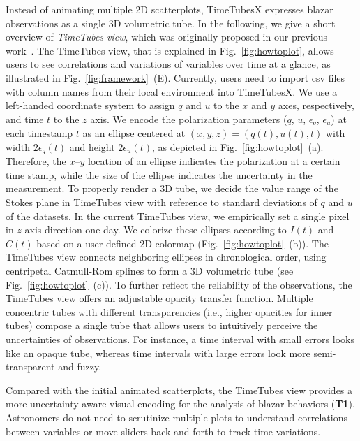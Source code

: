 Instead of animating multiple 2D scatterplots,
TimeTubesX expresses blazar observations as a single 3D volumetric tube. 
In the following, we give a short overview of \emph{TimeTubes view}, which was originally proposed in our previous work~\cite{Fujishiro2018}.
The TimeTubes view, that is explained in Fig.~\ref{fig:howtoplot}, allows users to see correlations and variations of variables over time at a glance, as illustrated in Fig.~\ref{fig:framework}~(E).
Currently, users need to import csv files with column names from their local environment into TimeTubesX.
%
We use a left-handed coordinate system to assign $q$ and $u$ to the $x$ and $y$ axes, respectively, and time $t$ to the $z$ axis.
We encode the polarization parameters ($q$, $u$, $\epsilon_q$, $\epsilon_u$) at each timestamp $t$ as an ellipse centered at $(x, y, z) = (q(t), u(t), t)$ with width $2\epsilon_q(t)$ and height $2\epsilon_u(t)$, as depicted in Fig.~\ref{fig:howtoplot}~(a). 
Therefore, the $x$--$y$ location of an ellipse indicates the polarization at a certain time stamp, while the size of the ellipse indicates the uncertainty in the measurement.
To properly render a 3D tube, we decide the value range of the Stokes plane in TimeTubes view with reference to standard deviations of $q$ and $u$ of the datasets. 
In the current TimeTubes view, we empirically set a single pixel in $z$ axis direction one day.
%
We colorize these ellipses according to $I(t)$ and $C(t)$ based on a user-defined 2D colormap (Fig.~\ref{fig:howtoplot}~(b)). 
The TimeTubes view connects neighboring ellipses in chronological order, using centripetal Catmull-Rom splines to form a 3D volumetric tube (see Fig.~\ref{fig:howtoplot}~(c)). 
To further reflect the reliability of the observations, the TimeTubes view offers an adjustable opacity transfer function.
Multiple concentric tubes with different transparencies (i.e., higher opacities for inner tubes) compose a single tube that allows users to intuitively perceive the uncertainties of observations.
For instance, a time interval with small errors looks like an opaque tube, whereas time intervals with large errors look more semi-transparent and fuzzy.

Compared with the initial animated scatterplots,
the TimeTubes view provides a more uncertainty-aware visual encoding for the analysis of blazar behaviors (\textbf{T1}).
Astronomers do not need to scrutinize multiple plots to understand correlations between variables
or move sliders back and forth %
to track time variations.

